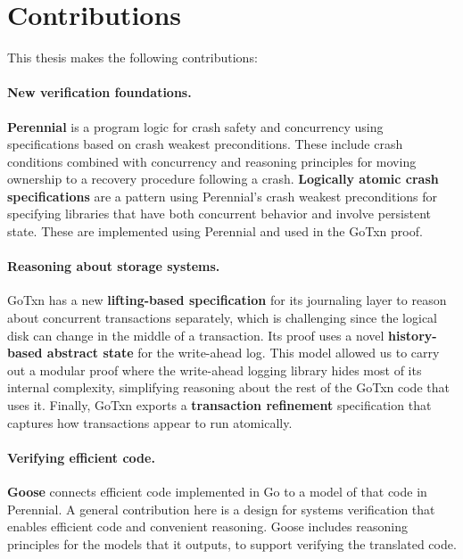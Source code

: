 \section{Contributions}
\label{sec:intro:contributions}

This thesis makes the following contributions:

\paragraph{New verification foundations.}
\textbf{Perennial} is a program logic for crash safety
and concurrency using specifications based on crash weakest
preconditions. These include crash conditions combined with concurrency
and reasoning principles for moving ownership to a recovery procedure
following a crash. \textbf{Logically atomic crash specifications} are a
pattern using Perennial's crash weakest preconditions for specifying
libraries that have both concurrent behavior and involve persistent
state. These are implemented using Perennial and used in the GoTxn
proof.

\paragraph{Reasoning about storage systems.}
GoTxn has a new \textbf{lifting-based specification} for its journaling
layer to reason about concurrent transactions separately, which is
challenging since the logical disk can change in the middle of a transaction. Its proof uses a novel
\textbf{history-based abstract state} for the write-ahead log. This model allowed us to carry
out a modular proof where the write-ahead logging library hides most of
its internal complexity, simplifying reasoning about the rest of the GoTxn
code that uses it. Finally, GoTxn exports a \textbf{transaction refinement}
specification that captures how transactions appear to run atomically.

\paragraph{Verifying efficient code.}
\textbf{Goose} connects efficient code implemented in Go to a model of that code
in Perennial. A general contribution here is a design for systems verification
that enables efficient code and convenient reasoning. Goose includes reasoning
principles for the models that it outputs, to support verifying the translated
code.

